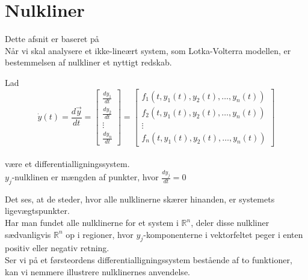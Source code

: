 \section{Nulkliner}
Dette afsnit er baseret på \citep[afsnit 9.1]{Hirsch} \\
Når vi skal analysere et ikke-lineært system, som Lotka-Volterra modellen, er bestemmelsen af nulkliner et nyttigt redskab.

\begin{definition}[Nulkliner]\label{NulKliner}
Lad 
\\
$$\dot{y}(t) = \frac{d\vec{y}}{dt} = 
\begin{bmatrix}
\frac{dy_1}{dt} \\
\frac{dy_2}{dt}\\
\vdots \\
\frac{dy_n}{dt}
\end{bmatrix}
=
\begin{bmatrix}
f_1(t, y_1(t), y_2(t), \hdots, y_n(t))\\
f_2(t, y_1(t), y_2(t), \hdots, y_n(t))\\
\vdots \\
f_n(t, y_1(t), y_2(t), \hdots, y_n(t))
\end{bmatrix}$$
\\
være et differentialligningssystem. \\
$y_j$-nulklinen er mængden af punkter, hvor $\frac{dy_j}{dt}=0$ 
\end{definition}
Det ses, at de steder, hvor alle nulklinerne skærer hinanden, er systemets ligevægtspunkter. \\
Har man fundet alle nulklinerne for et system i $\mathbb{R}^n$, deler disse nulkliner sædvanligvis $\mathbb{R}^n$ op i regioner, hvor $y_j$-komponenterne i vektorfeltet peger i enten positiv eller negativ retning. \\
Ser vi på et førsteordens differentialligningssystem bestående af to funktioner, kan vi nemmere illustrere nulklinernes anvendelse.
